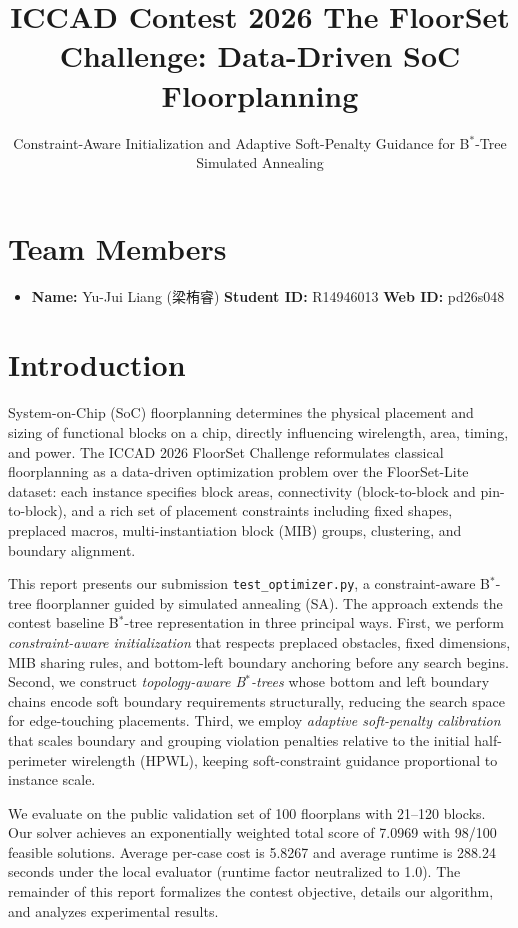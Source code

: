 \documentclass[11pt]{article}
\title{\textbf{ICCAD Contest 2026 The FloorSet Challenge: Data-Driven SoC Floorplanning}}
\author{Constraint-Aware Initialization and Adaptive Soft-Penalty Guidance for B$^*$-Tree Simulated Annealing}
\date{}
\begin{document}
\maketitle

\section*{Team Members}
\begin{itemize}[noitemsep, topsep=0pt, leftmargin=2em]
    \item \textbf{Name:} Yu-Jui Liang (梁栯睿) \quad \textbf{Student ID:} R14946013 \quad \textbf{Web ID:} pd26s048
\end{itemize}

\section{Introduction}

System-on-Chip (SoC) floorplanning determines the physical placement and sizing of functional blocks on a chip, directly influencing wirelength, area, timing, and power. The ICCAD 2026 FloorSet Challenge reformulates classical floorplanning as a data-driven optimization problem over the FloorSet-Lite dataset: each instance specifies block areas, connectivity (block-to-block and pin-to-block), and a rich set of placement constraints including fixed shapes, preplaced macros, multi-instantiation block (MIB) groups, clustering, and boundary alignment.

This report presents our submission \texttt{test\_optimizer.py}, a constraint-aware B$^*$-tree floorplanner guided by simulated annealing (SA). The approach extends the contest baseline B$^*$-tree representation in three principal ways. First, we perform \emph{constraint-aware initialization} that respects preplaced obstacles, fixed dimensions, MIB sharing rules, and bottom-left boundary anchoring before any search begins. Second, we construct \emph{topology-aware B$^*$-trees} whose bottom and left boundary chains encode soft boundary requirements structurally, reducing the search space for edge-touching placements. Third, we employ \emph{adaptive soft-penalty calibration} that scales boundary and grouping violation penalties relative to the initial half-perimeter wirelength (HPWL), keeping soft-constraint guidance proportional to instance scale.

We evaluate on the public validation set of 100 floorplans with 21--120 blocks. Our solver achieves an exponentially weighted total score of 7.0969 with 98/100 feasible solutions. Average per-case cost is 5.8267 and average runtime is 288.24 seconds under the local evaluator (runtime factor neutralized to 1.0). The remainder of this report formalizes the contest objective, details our algorithm, and analyzes experimental results.
\end{document}
